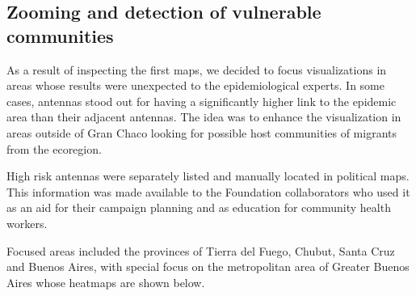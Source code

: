 \subsection{Zooming and detection of vulnerable communities}

As a result of inspecting the first maps, we decided to focus visualizations in areas whose results were unexpected to the epidemiological experts. In some cases, antennas stood out for having a significantly higher link to the epidemic area than their adjacent antennas. The idea was to enhance the visualization in areas outside of Gran Chaco looking for possible host communities of migrants from the ecoregion.

High risk antennas were separately listed and manually located in political maps. This information was made available to the Foundation collaborators who used it as an aid for their campaign planning and as education for community health workers. 

Focused areas included the provinces of Tierra del Fuego, Chubut, Santa Cruz and Buenos Aires, with special focus on the metropolitan area of Greater Buenos Aires whose heatmaps are shown below.

